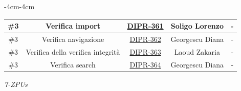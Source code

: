 \documentclass[a4paper,12pt]{article}
\begin{document}
\begin{table}[H]
\begin{adjustwidth}{-4cm}{-4cm}
\begin{tabular}{|c|c|c|c|c|}
    \hline
    \#3 & Verifica import & \href{https://7zpus.atlassian.net/browse/DIPR-361}{DIPR-361} & Soligo Lorenzo & - \\
    \hline
    \#3 & Verifica navigazione & \href{https://7zpus.atlassian.net/browse/DIPR-362}{DIPR-362} & Georgescu Diana & - \\
    \hline
    \#3 & Verifica della verifica integrità & \href{https://7zpus.atlassian.net/browse/DIPR-363}{DIPR-363} & Laoud Zakaria & - \\
    \hline
    \#3 & Verifica search & \href{https://7zpus.atlassian.net/browse/DIPR-364}{DIPR-364} & Georgescu Diana & - \\
    \hline
\end{tabular}
    \end{adjustwidth}
\end{table}

\vfill
\begin{flushright}
    \textit{7-ZPUs}
\end{flushright}
\end{document}
